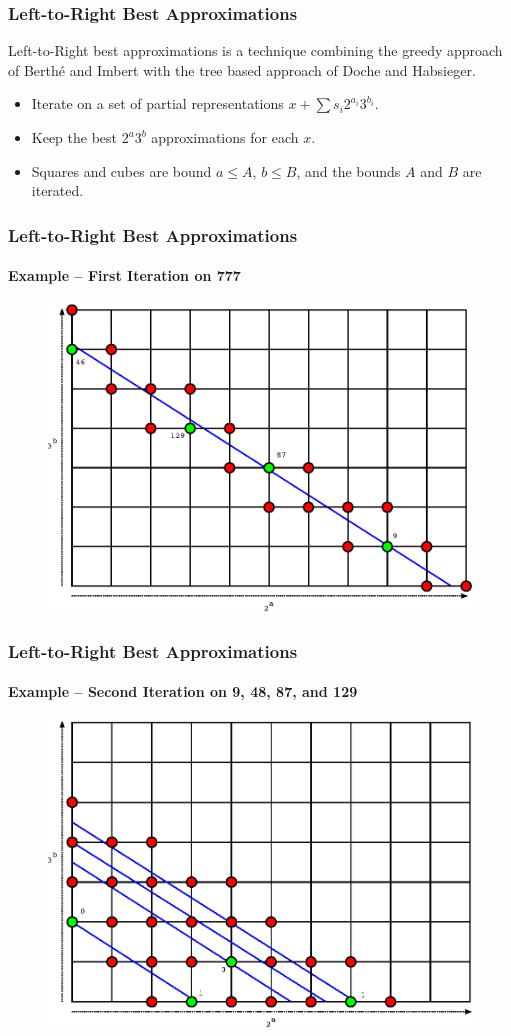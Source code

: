 \documentclass{beamer}
\begin{document}
\begin{frame}
\frametitle{Left-to-Right Best Approximations}
Left-to-Right best approximations is a technique combining the greedy approach of Berth{\'e} and Imbert with the tree based approach of Doche and Habsieger.
\begin{itemize}
\item Iterate on a set of partial representations $x + \sum s_i2^{a_i}3^{b_i}$.
\item Keep the best $2^a 3^b$ approximations for each $x$.
\item Squares and cubes are bound $a \le A$, $b \le B$, and the bounds $A$ and $B$ are iterated.
\end{itemize}
\end{frame}

\begin{frame}
\frametitle{Left-to-Right Best Approximations}
\framesubtitle{Example -- First Iteration on 777}
\begin{figure}
\includegraphics[scale=0.84]{best-approx-777}
\end{figure}
\end{frame}
\begin{frame}
\frametitle{Left-to-Right Best Approximations}
\framesubtitle{Example -- Second Iteration on 9, 48, 87, and 129}
\begin{figure}
\includegraphics[scale=0.84]{best-approx-9-48-87-129}
\end{figure}
\end{frame}
\end{document}
